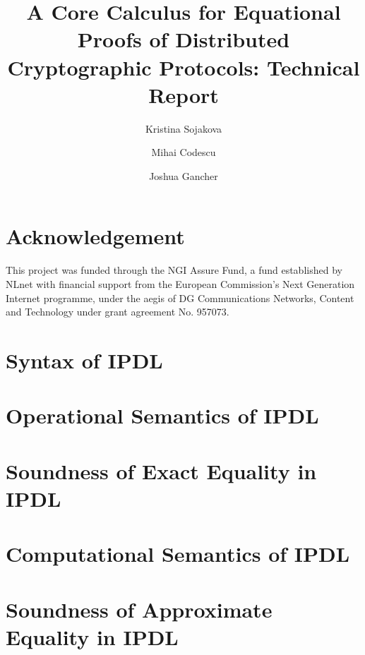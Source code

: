 \documentclass[11pt,hidelinks]{article}
\begin{document}
\title{A Core Calculus for Equational Proofs of Distributed Cryptographic Protocols: Technical Report}
\author{Kristina Sojakova \and Mihai Codescu \and Joshua Gancher}

\maketitle

\section*{\small Acknowledgement}
This project was funded through the NGI Assure Fund, a fund established by NLnet with financial support from the European Commission's Next Generation Internet programme, under the aegis of DG Communications Networks, Content and Technology under grant agreement No. 957073.

\section{Syntax of IPDL}


\section{Operational Semantics of IPDL}


\section{Soundness of Exact Equality in IPDL}


\section{Computational Semantics of IPDL}


\section{Soundness of Approximate Equality in IPDL}


%

 

\end{document}

